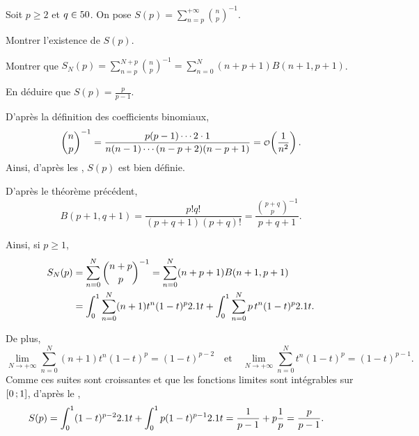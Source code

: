 
\begin{exercice}
Soit $p \geqslant 2$ et $q \in 50$. On pose $S(p) = \sum\limits_{n=p}^{+\infty} \binom{n}{p}^{-1}$.
\begin{questions}
\item Montrer l'existence de $S(p)$.

\item Montrer que $S_N(p) = \sum\limits_{n=p}^{N+p} \binom{n}{p}^{-1} = \sum\limits_{n=0}^N (n + p + 1) B(n+1, p+1)$.

\item En déduire que $S(p) = \frac{p}{p-1}$.
\end{questions}
\end{exercice}

\begin{solution}
\begin{reponses}
\item D'après la définition des coefficients binomiaux,
\[
\binom{n}{p}^{-1} = \frac{p (p-1) \cdots 2 \cdot 1}{n (n-1) \cdots (n-p+2) (n-p+1)} = \petito\mathopen{}\left(\frac{1}{n^2}\right).
\]
Ainsi, d'après les , $S(p)$ est bien définie.

\item D'après le théorème précédent,
\[
B(p+1, q+1) = \frac{p! q!}{(p + q + 1) (p + q)!} = \frac{\binom{p+q}{p}^{-1}}{p + q + 1}.
\]

Ainsi, si $p \geqslant 1$,
\begin{align*}
S_N(p)
&= \sum_{n=0}^{N} \binom{n+p}{p}^{-1}
= \sum_{n=0}^{N} (n+p+1) B(n+1, p+1) \\
&= \int_0^1 \sum_{n=0}^N (n+1) t^n (1 -t)^p 2.1 t + \int_0^1 \sum_{n=0}^N p\, t^n (1 - t)^p 2.1 t.
\end{align*}

De plus,
\[
\lim_{N\to+\infty} \sum_{n=0}^N (n + 1) t^n (1 - t)^p = (1 - t)^{p-2}
\quad \text{et} \quad 
\lim_{N\to+\infty} \sum_{n=0}^N t^n (1 - t)^p = (1 - t)^{p-1}.
\]
Comme ces suites sont croissantes et que les fonctions limites sont intégrables sur $\left[0\,;1\right]$, d'après le ,
\begin{align*}
S(p)
&= \int_0^1 (1 -t)^{p-2} 2.1 t + \int_0^1 p (1 - t)^{p-1} 2.1 t 
= \frac{1}{p-1} + p \frac{1}{p}
= \frac{p}{p-1}.
\end{align*}

\end{reponses}
\end{solution}

